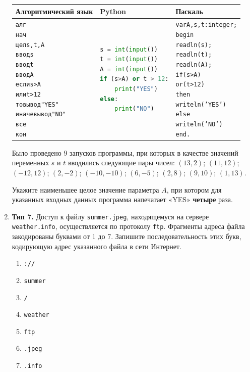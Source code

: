 \documentclass[a4paper]{article}
\begin{document}
\begin{enumerate}[label=\textbf{Задача \arabic*.}, leftmargin=*, itemsep=10mm]
\bigskip
\begin{center}
\begin{tabular}{|p{4.2cm}|p{4.2cm}|p{4.7cm}|}
\hline
\textbf{Алгоритмический язык} & \textbf{Python} & \textbf{Паскаль} \\[2pt]
\hline
\begin{alltt}\footnotesize
алг
нач
  цел s, t, A
  ввод s
  ввод t
  ввод A
  если s > A
     или t > 12
    то вывод "YES"
    иначе вывод "NO"
  все
кон
\end{alltt}
&
\begin{lstlisting}[frame=none,language=Python,basicstyle=\ttfamily\footnotesize]
s = int(input())
t = int(input())
A = int(input())
if (s>A) or t > 12:
    print("YES")
else:
    print("NO")
\end{lstlisting}
&
\begin{alltt}\footnotesize
var A, s, t: integer;
begin
  readln(s);
  readln(t);
  readln(A);
  if (s > A)
  or (t > 12)
  then
    writeln('YES')
  else
    writeln('NO')
end.
\end{alltt}
\\
\hline
\end{tabular}
\end{center}
\bigskip

Было проведено 9 запусков программы, при которых в качестве значений
переменных $s$ и $t$ вводились следующие пары чисел:
$(13, 2)$; $(11, 12)$; $(-12, 12)$; $(2, -2)$; $(-10, -10)$;
$(6, -5)$; $(2, 8)$; $(9, 10)$; $(1, 13)$.

Укажите наименьшее целое значение параметра $A$, при котором для указанных
входных данных программа напечатает «YES» \textbf{четыре} раза.

\item \textbf{Тип 7.}
Доступ к файлу \texttt{summer.jpeg}, находящемуся на сервере
\texttt{weather.info}, осуществляется по протоколу \texttt{ftp}.
Фрагменты адреса файла закодированы буквами от 1 до 7.
Запишите последовательность этих букв, кодирующую адрес указанного файла
в сети Интернет.

\begin{enumerate}[label=\arabic*), itemsep=1pt]
  \item \texttt{://}
  \item \texttt{summer}
  \item \texttt{/}
  \item \texttt{weather}
  \item \texttt{ftp}
  \item \texttt{.jpeg}
  \item \texttt{.info}
\end{enumerate}


\end{enumerate}
\end{document}
